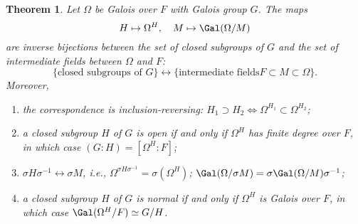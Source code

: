 \documentclass[a4paper,11pt,final,openany]{memoir}
\newtheorem{theorem}[X]{Theorem}
\theoremstyle{nonumberplain}
\begin{document}
\begin{theorem}
\label{ig6}Let $\Omega$ be Galois over $F$ with Galois group $G$. The maps
\[
H\mapsto\Omega^{H},\quad M\mapsto\Gal(\Omega/M)
\]
are inverse bijections between the set of closed subgroups of $G$ and the set
of intermediate fields between $\Omega$ and $F$:%
\[
\{\text{closed subgroups of }G\}\leftrightarrow\{\text{intermediate fields
}F\subset M\subset\Omega\}.
\]
Moreover,

\begin{enumerate}
\item the correspondence is inclusion-reversing: $H_{1}\supset H_{2}\iff
\Omega^{H_{1}}\subset\Omega^{H_{2}}$;

\item a closed subgroup $H$ of $G$ is open if and only if $\Omega^{H}$ has
finite degree over $F$, in which case $(G\colon H)=[\Omega^{H}\colon F]$;

\item $\sigma H\sigma^{-1}\leftrightarrow\sigma M$, i.e., $\Omega^{\sigma
H\sigma^{-1}}=\sigma(\Omega^{H})$; $\Gal(\Omega/\sigma M)=\sigma
\Gal(\Omega/M)\sigma^{-1}$;

\item a closed subgroup $H$ of $G$ is normal if and only if $\Omega^{H}$ is
Galois over $F$, in which case $\Gal(\Omega^{H}/F)\simeq G/H$.
\end{enumerate}
\end{theorem}
\end{document}
